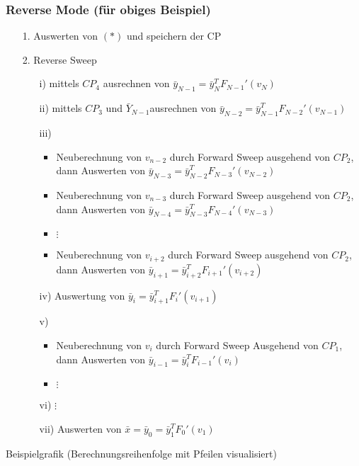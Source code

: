 \subsubsection{Reverse Mode (für obiges Beispiel)}
\label{subsubsec:RM_example}
\begin{itemize}
	\item[1.] Auswerten von $(*)$ und speichern der CP
	\item[2.] Reverse Sweep
	\begin{itemize}
		\item[i)]  mittels $CP_4$ ausrechnen von $\bar{y}_{N-1}=\bar{y}_N^T F_{N-1}'(v_N)$
		\item[ii)] mittels $CP_3$ und $\bar{Y}_{N-1}$ausrechnen von $\bar{y}_{N-2}=\bar{y}_{N-1}^T F_{N-2}'(v_{N-1})$
		\item[iii)]
		\begin{itemize}
			\item Neuberechnung von  $v_{n-2}$ durch Forward Sweep ausgehend von $CP_2$, dann Auswerten von $\bar{y}_{N-3}=\bar{y}_{N-2}^T F_{N-3}'(v_{N-2})$
			\item Neuberechnung von  $v_{n-3}$ durch Forward Sweep ausgehend von $CP_2$, dann Auswerten von $\bar{y}_{N-4}=\bar{y}_{N-3}^T F_{N-4}'(v_{N-3})$
			\item $\vdots$
			\item Neuberechnung von  $v_{i+2}$ durch Forward Sweep ausgehend von $CP_2$, dann Auswerten von $\bar{y}_{i+1}=\bar{y}_{i+2}^T F_{i+1}'(v_{i+2})$
		\end{itemize}
		\item[iv)] Auswertung von $\bar{y}_{i}=\bar{y}_{i+1}^T F_{i}'(v_{i+1})$
		\item[v)]
		\begin{itemize}
			\item Neuberechnung von $v_i$ durch Forward Sweep Ausgehend von $CP_1$, dann Auswerten von $\bar{y}_{i-1}=\bar{y}_{i}^T F_{i-1}'(v_{i})$
			\item $\vdots$
		\end{itemize}
		\item[vi)] $\vdots$
		\item[vii)] Auswerten von $\bar{x}=\bar{y}_0=\bar{y}_1^TF_0'(v_1)$
	\end{itemize}
\end{itemize}

Beispielgrafik (Berechnungsreihenfolge mit Pfeilen visualisiert)\\
\vspace{3cm}

